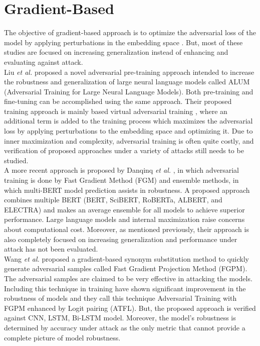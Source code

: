 \documentclass[%
	BCOR=8mm, %
	DIV=12,
	toc=bibliography, %
	toc=listof, %
	oneside, %
	egregdoesnotlikesansseriftitles, %
	]{scrbook}
\begin{document}
\section{Gradient-Based }
\label{section:GradBasedAdvTra}
The objective of gradient-based approach is to optimize the adversarial loss of the model by applying perturbations in the embedding space \cite{liu_adversarial_2020,goodfellow_explaining_2015,zhu_at-bert_2021,miyato_adversarial_2017,jiang_smart_2020-1}.  But, most of these studies are focused on increasing generalization instead of enhancing and evaluating against attack.\\
 Liu \textit{et al.} \cite{liu_adversarial_2020} proposed a novel adversarial pre-training approach intended to increase the robustness and generalization of large neural language models called ALUM (Adversarial Training for Large Neural Language Models). Both pre-training and fine-tuning can be accomplished using the same approach. Their proposed training approach is mainly based virtual adversarial training \cite{miyato_virtual_2018}, where an additional term is added to the training process which maximizes the adversarial loss by applying perturbations to the embedding space and optimizing it. Due to inner maximization and complexity, adversarial training is often quite costly, and verification of proposed approaches under a variety of attacks still needs to be studied.\\
A more recent approach is proposed by Danqinq \textit{et al.} \cite{zhu_at-bert_2021}, in which adversarial training is done by Fast Gradient Method (FGM) \cite{miyato_adversarial_2017} and ensemble methods, in which multi-BERT model prediction assists in robustness. A proposed approach combines multiple BERT (BERT, SciBERT, RoBERTa, ALBERT, and ELECTRA) and makes an average ensemble for all models to achieve superior performance. Large language models and internal maximization raise concerns about computational cost. Moreover, as mentioned previously, their approach is also completely focused on increasing generalization and performance under attack has not been evaluated.\\
Wang \textit{et al.} \cite{wang_adversarial_2021-1} proposed a gradient-based synonym substitution method to quickly generate adversarial samples called Fast Gradient Projection Method (FGPM). The adversarial samples are claimed to be very effective in attacking the models. Including this technique in training have shown significant improvement in the robustness of models and they call this technique Adversarial Training with FGPM enhanced by Logit pairing (ATFL). But, the proposed approach is verified against CNN, LSTM, Bi-LSTM model. Moreover, the model's robustness is determined by accuracy under attack as the only metric that cannot provide a complete picture of model robustness.
\end{document}
